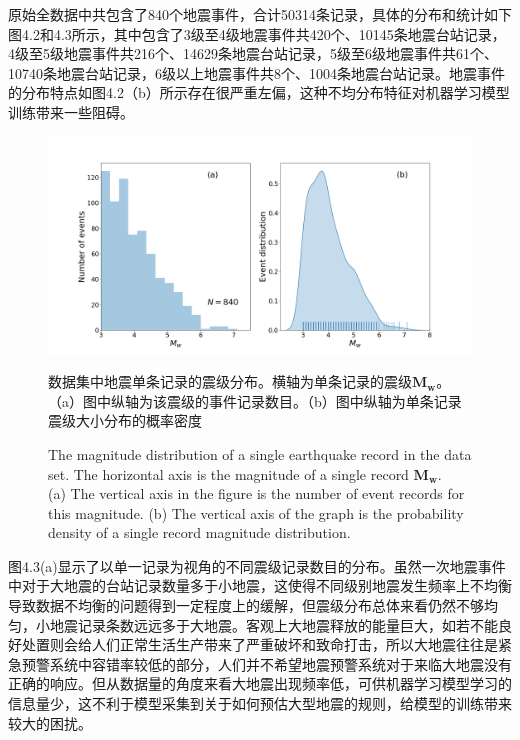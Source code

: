 \indent 原始全数据中共包含了840个地震事件，合计50314条记录，具体的分布和统计如下图4.2和4.3所示，其中包含了3级至4级地震事件共420个、10145条地震台站记录，4级至5级地震事件共216个、14629条地震台站记录，5级至6级地震事件共61个、10740条地震台站记录，6级以上地震事件共8个、1004条地震台站记录。地震事件的分布特点如图4.2（b）所示存在很严重左偏，这种不均分布特征对机器学习模型训练带来一些阻碍。\\
\begin{figure}[!h] 
\centering 
\includegraphics[width=0.95\linewidth]{img/Event_distribution.png}
\renewcommand{\figurename}{图} 
\caption{数据集中地震单条记录的震级分布。横轴为单条记录的震级$\mathbf{M}_{\mathbf{w}}$。\\
（a）图中纵轴为该震级的事件记录数目。（b）图中纵轴为单条记录震级大小分布的概率密度} 
\addtocounter{figure}{-1} \vspace{-5pt} 
\renewcommand{\figurename}{Fig} 
\caption{The magnitude distribution of a single earthquake record in the data set. The horizontal axis is the magnitude of a single record $\mathbf{M}_{\mathbf{w}}$. \\
(a) The vertical axis in the figure is the number of event records for this magnitude. (b) The vertical axis of the graph is the probability density of a single record magnitude distribution.
} 
\renewcommand{\figurename}{图} 
\label{fig:network-device-influence.png} 
\end{figure}
\indent 图4.3(a)显示了以单一记录为视角的不同震级记录数目的分布。虽然一次地震事件中对于大地震的台站记录数量多于小地震，这使得不同级别地震发生频率上不均衡导致数据不均衡的问题得到一定程度上的缓解，但震级分布总体来看仍然不够均匀，小地震记录条数远远多于大地震。客观上大地震释放的能量巨大，如若不能良好处置则会给人们正常生活生产带来了严重破坏和致命打击，所以大地震往往是紧急预警系统中容错率较低的部分，人们并不希望地震预警系统对于来临大地震没有正确的响应。但从数据量的角度来看大地震出现频率低，可供机器学习模型学习的信息量少，这不利于模型采集到关于如何预估大型地震的规则，给模型的训练带来较大的困扰。\\
